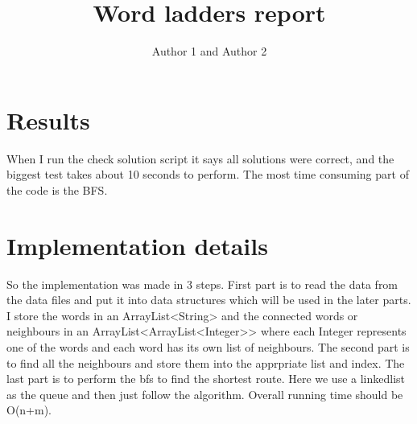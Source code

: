 \documentclass{article}
\title{Word ladders report}
\author{Author 1 and Author 2}
\begin{document}
  \maketitle

  \section{Results}

When I run the check solution script it says all solutions were correct, and the biggest test takes about 10 seconds to perform. The most time consuming part of the code is the BFS. 
  \section{Implementation details}

So the implementation was made in 3 steps. First part is to read the data from the data files and put it into data structures which will be used in the later parts.
I store the words in an ArrayList<String> and the connected words or neighbours in an ArrayList<ArrayList<Integer>> where each Integer represents one of the words and each word has its own list of neighbours. 
The second part is to find all the neighbours and store them into the apprpriate list and index. The last part is to perform the bfs to find the 
shortest route. Here we use a linkedlist as the queue and then just follow the algorithm. Overall running time should be O(n+m).
\end{document}
